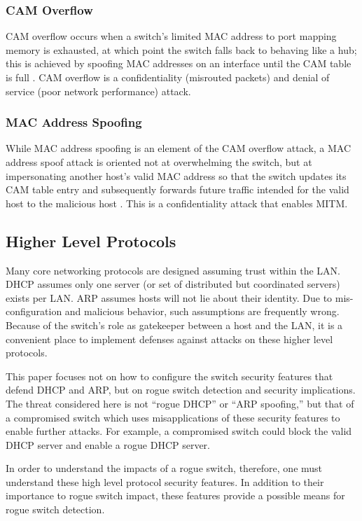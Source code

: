 \documentclass[journal]{IEEEtran}
\begin{document}
\subsubsection{CAM Overflow} CAM overflow occurs when a switch's limited MAC address to port mapping
memory is exhausted, at which point the switch falls back to behaving like a hub; this is achieved
by spoofing MAC addresses on an interface until the CAM table is full \cite{b1}. CAM overflow is a
confidentiality (misrouted packets) and denial of service (poor network performance) attack.

\subsubsection{MAC Address Spoofing} While MAC address spoofing is an element of the CAM overflow
attack, a MAC address spoof attack is oriented not at overwhelming the switch, but at impersonating
another host's valid MAC address so that the switch updates its CAM table entry and subsequently
forwards future traffic intended for the valid host to the malicious host \cite{b1}. This is a
confidentiality attack that enables MITM.

\subsection{Higher Level Protocols}
Many core networking protocols are designed assuming trust within the LAN. DHCP assumes only one
server (or set of distributed but coordinated servers) exists per LAN. ARP assumes hosts will not
lie about their identity. Due to mis-configuration and malicious behavior, such assumptions are
frequently wrong. Because of the switch's role as gatekeeper between a host and the LAN, it is a
convenient place to implement defenses against attacks on these higher level protocols.

This paper focuses not on how to configure the switch security features that defend DHCP and ARP,
but on rogue switch detection and security implications. The threat considered here is not ``rogue
DHCP'' or ``ARP spoofing,'' but that of a compromised switch which uses misapplications of these
security features to enable further attacks. For example, a compromised switch could block the valid
DHCP server and enable a rogue DHCP server.

In order to understand the impacts of a rogue switch, therefore, one must understand these high
level protocol security features. In addition to their importance to rogue switch impact, these
features provide a possible means for rogue switch detection.
\end{document}
